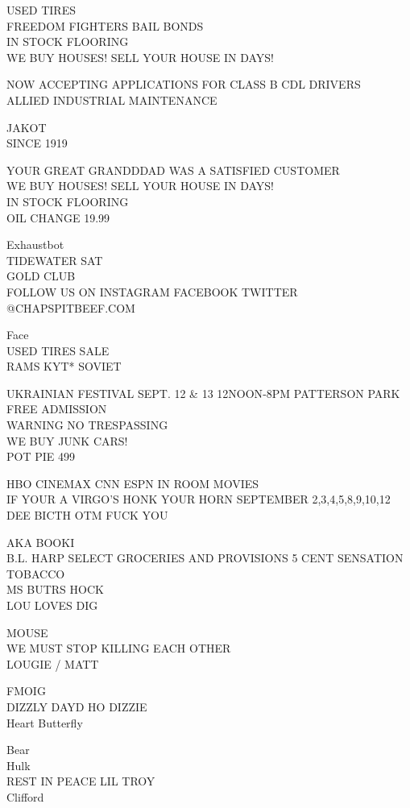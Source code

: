 \documentclass[10pt,letterpaper]{article}
\begin{document}
USED TIRES\\
FREEDOM FIGHTERS BAIL BONDS\\
IN STOCK FLOORING\\
WE BUY HOUSES!  SELL YOUR HOUSE IN DAYS!

NOW ACCEPTING APPLICATIONS FOR CLASS B CDL DRIVERS\\
ALLIED INDUSTRIAL MAINTENANCE

JAKOT\\
SINCE 1919

YOUR GREAT GRANDDDAD WAS A SATISFIED CUSTOMER\\
WE BUY HOUSES!  SELL YOUR HOUSE IN DAYS!\\
IN STOCK FLOORING\\
OIL CHANGE 19.99

Exhaustbot\\
TIDEWATER SAT\\
GOLD CLUB\\
FOLLOW US ON INSTAGRAM FACEBOOK TWITTER @CHAPSPITBEEF.COM

Face\\
USED TIRES SALE\\
RAMS KYT* SOVIET

UKRAINIAN FESTIVAL SEPT. 12 \& 13 12NOON{-}8PM PATTERSON PARK FREE ADMISSION\\
WARNING NO TRESPASSING\\
WE BUY JUNK CARS!\\
POT PIE 499

HBO CINEMAX CNN ESPN IN ROOM MOVIES\\
IF YOUR A VIRGO'S HONK YOUR HORN SEPTEMBER 2,3,4,5,8,9,10,12\\
DEE BICTH OTM FUCK YOU

AKA BOOKI\\
B.L. HARP SELECT GROCERIES AND PROVISIONS 5 CENT SENSATION TOBACCO\\
MS BUTRS HOCK\\
LOU LOVES DIG

MOUSE\\
WE MUST STOP KILLING EACH OTHER\\
LOUGIE / MATT

FMOIG\\
DIZZLY DAYD HO DIZZIE\\
Heart Butterfly

Bear\\
Hulk\\
REST IN PEACE LIL TROY\\
Clifford
\end{document}
